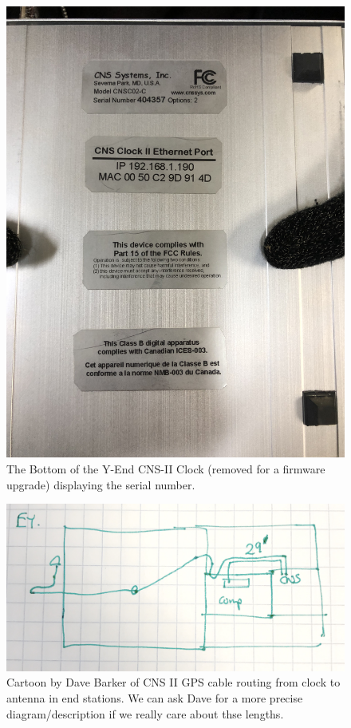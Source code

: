 \documentclass{article}
\begin{document}
\begin{figure}
	\begin{center}
		\includegraphics[width=0.8\linewidth]{img/cns-ii-ey-bottom-view.jpeg}
	\end{center}
	\caption{The Bottom of the Y-End CNS-II Clock (removed for a firmware upgrade) displaying the serial number.}
	\label{fig:cns-ii-ey-bottom}
\end{figure}
\begin{figure}
	\begin{center}
		\includegraphics[width=0.8\linewidth]{img/endstation-antenna-cable.jpeg}
	\end{center}
	\caption{Cartoon by Dave Barker of CNS II GPS cable routing from clock to antenna in end stations. We can ask Dave for a more precise diagram/description if we really care about thse lengths.}
	\label{fig:routing}
\end{figure}
\end{document}
